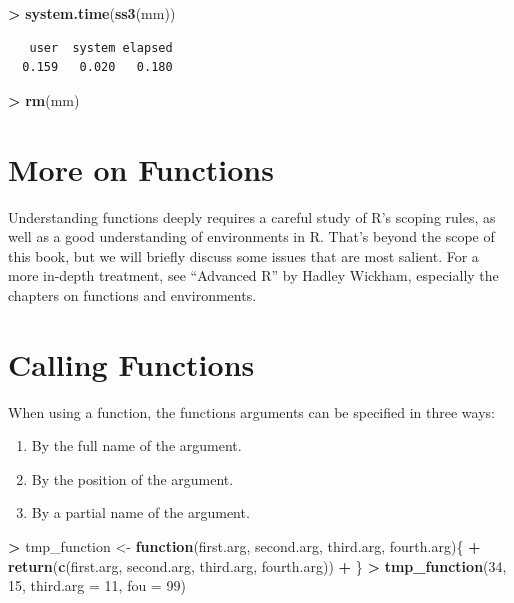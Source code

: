\documentclass[
]{krantz}
\makeatletter
\newenvironment{Shaded}{\begin{snugshade}}{\end{snugshade}}
\newcommand{\ControlFlowTok}[1]{\textcolor[rgb]{0.27,0.27,0.27}{\textbf{#1}}}
\newcommand{\DataTypeTok}[1]{\textcolor[rgb]{0.27,0.27,0.27}{#1}}
\newcommand{\DecValTok}[1]{\textcolor[rgb]{0.06,0.06,0.06}{#1}}
\newcommand{\KeywordTok}[1]{\textcolor[rgb]{0.27,0.27,0.27}{\textbf{#1}}}
\newcommand{\NormalTok}[1]{#1}
\newcommand{\OperatorTok}[1]{\textcolor[rgb]{0.43,0.43,0.43}{\textbf{#1}}}
\newcommand{\StringTok}[1]{\textcolor[rgb]{0.5,0.5,0.5}{#1}}
\providecommand{\tightlist}{%
  \setlength{\itemsep}{0pt}\setlength{\parskip}{0pt}}
\newenvironment{kframe}{%
\medskip{}
\setlength{\fboxsep}{.8em}
 \def\at@end@of@kframe{}%
 \ifinner\ifhmode%
  \def\at@end@of@kframe{\end{minipage}}%
  \begin{minipage}{\columnwidth}%
 \fi\fi%
 \def\FrameCommand##1{\hskip\@totalleftmargin \hskip-\fboxsep
 \colorbox{shadecolor}{##1}\hskip-\fboxsep
     \hskip-\linewidth \hskip-\@totalleftmargin \hskip\columnwidth}%
 \MakeFramed {\advance\hsize-\width
   \@totalleftmargin\z@ \linewidth\hsize
   \@setminipage}}%
 {\par\unskip\endMakeFramed%
 \at@end@of@kframe}
\renewenvironment{Shaded}{\begin{kframe}}{\end{kframe}}
\makeatother
\begin{document}
\begin{Shaded}
\begin{Highlighting}[]
\OperatorTok{\textgreater{}}\StringTok{ }\KeywordTok{system.time}\NormalTok{(}\KeywordTok{ss3}\NormalTok{(mm))}
\end{Highlighting}
\end{Shaded}

\begin{verbatim}
   user  system elapsed 
  0.159   0.020   0.180 
\end{verbatim}

\begin{Shaded}
\begin{Highlighting}[]
\OperatorTok{\textgreater{}}\StringTok{ }\KeywordTok{rm}\NormalTok{(mm)}
\end{Highlighting}
\end{Shaded}

\hypertarget{more-on-functions}{%
\section{More on Functions}\label{more-on-functions}}

Understanding functions deeply requires a careful study of R's scoping rules, as well as a good understanding of environments in R. That's beyond the scope of this book, but we will briefly discuss some issues that are most salient. For a more in-depth treatment, see ``Advanced R'' by Hadley Wickham, especially the chapters on functions and environments.

\hypertarget{calling-functions}{%
\section{Calling Functions}\label{calling-functions}}

When using a function, the functions arguments can be specified in three ways:

\begin{enumerate}
\def\labelenumi{\arabic{enumi}.}
\tightlist
\item
  By the full name of the argument.
\item
  By the position of the argument.
\item
  By a partial name of the argument.
\end{enumerate}

\begin{Shaded}
\begin{Highlighting}[]
\OperatorTok{\textgreater{}}\StringTok{ }\NormalTok{tmp\_function \textless{}{-}}\StringTok{ }\ControlFlowTok{function}\NormalTok{(first.arg, second.arg, third.arg, fourth.arg)\{}
\OperatorTok{+}\StringTok{     }\KeywordTok{return}\NormalTok{(}\KeywordTok{c}\NormalTok{(first.arg, second.arg, third.arg, fourth.arg))}
\OperatorTok{+}\StringTok{ }\NormalTok{\}}
\OperatorTok{\textgreater{}}\StringTok{ }\KeywordTok{tmp\_function}\NormalTok{(}\DecValTok{34}\NormalTok{, }\DecValTok{15}\NormalTok{, }\DataTypeTok{third.arg =} \DecValTok{11}\NormalTok{, }\DataTypeTok{fou =} \DecValTok{99}\NormalTok{)}
\end{Highlighting}
\end{Shaded}
\end{document}
